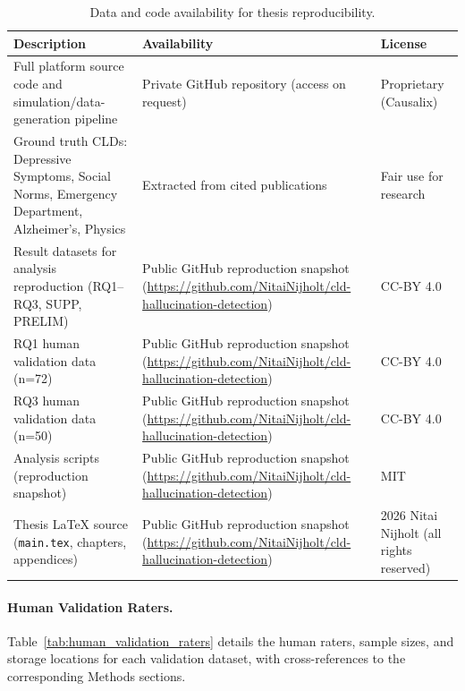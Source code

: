 \begin{table}[ht]
\centering
\begin{tabularx}{\textwidth}{|>{\raggedright\arraybackslash}X|>{\raggedright\arraybackslash}X|>{\raggedright\arraybackslash}p{3cm}|}
\hline
\textbf{Description} & \textbf{Availability} & \textbf{License} \\
\hline
Full platform source code and simulation/data-generation pipeline & Private GitHub repository (access on request) & Proprietary (Causalix) \\
\hline
Ground truth CLDs: Depressive Symptoms, Social Norms, Emergency Department, Alzheimer's, Physics & Extracted from cited publications & Fair use for research \\
\hline
Result datasets for analysis reproduction (RQ1--RQ3, SUPP, PRELIM) & Public GitHub reproduction snapshot (\url{https://github.com/NitaiNijholt/cld-hallucination-detection}) & CC-BY 4.0 \\
\hline
RQ1 human validation data (n=72) & Public GitHub reproduction snapshot (\url{https://github.com/NitaiNijholt/cld-hallucination-detection}) & CC-BY 4.0 \\
\hline
RQ3 human validation data (n=50) & Public GitHub reproduction snapshot (\url{https://github.com/NitaiNijholt/cld-hallucination-detection}) & CC-BY 4.0 \\
\hline
Analysis scripts (reproduction snapshot) & Public GitHub reproduction snapshot (\url{https://github.com/NitaiNijholt/cld-hallucination-detection}) & MIT \\
\hline
Thesis \LaTeX{} source (\texttt{main.tex}, chapters, appendices) & Public GitHub reproduction snapshot (\url{https://github.com/NitaiNijholt/cld-hallucination-detection}) & \textcopyright{} 2026 Nitai Nijholt (all rights reserved) \\
\hline
\end{tabularx}
\caption{Data and code availability for thesis reproducibility.}
\label{tab:data_availability}
\end{table}

\paragraph{Human Validation Raters.} Table~\ref{tab:human_validation_raters} details the human raters, sample sizes, and storage locations for each validation dataset, with cross-references to the corresponding Methods sections.

